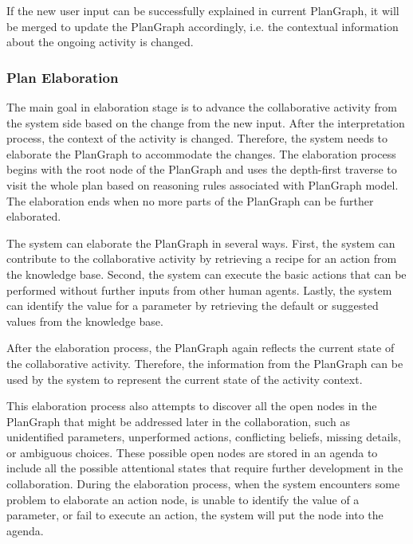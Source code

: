 If the new user input can be successfully explained in current PlanGraph, it will be merged to update the PlanGraph accordingly, i.e. the contextual information about the ongoing activity is changed.

\subsubsection*{Plan Elaboration}
The main goal in elaboration stage is to advance the collaborative activity from the system side based on the change from the new input. After the interpretation process, the context of the activity is changed. Therefore, the system needs to elaborate the PlanGraph to accommodate the changes. The elaboration process begins with the root node of the PlanGraph and uses the depth-first traverse to visit the whole plan based on reasoning rules associated with PlanGraph model. The elaboration ends when no more parts of the PlanGraph can be further elaborated.

The system can elaborate the PlanGraph in several ways. First, the system can contribute to the collaborative activity by retrieving a recipe for an action from the knowledge base. Second, the system can execute the basic actions that can be performed without further inputs from other human agents. Lastly, the system can identify the value for a parameter by retrieving the default or suggested values from the knowledge base. 

After the elaboration process, the PlanGraph again reflects the current state of the collaborative activity. Therefore, the information from the PlanGraph can be used by the system to represent the current state of the activity context. 

This elaboration process also attempts to discover all the open nodes in the PlanGraph that might be addressed later in the collaboration, such as unidentified parameters, unperformed actions, conflicting beliefs, missing details, or ambiguous choices. These possible open nodes are   stored in an agenda to include all the possible attentional states that require further development in the collaboration. During the elaboration process, when the system encounters some problem to elaborate an action node, is unable to identify the value of a parameter, or fail to execute an action, the system will put the node into the agenda.






 

